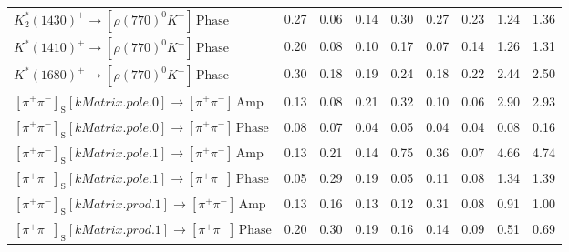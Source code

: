 \begin{tabular}{l  c  c  c  c  c  c  c  | c }
$K_{2}^{*}(1430)^{+}\rightarrow \left[\rho(770)^{0}K^{+}\right]\,\text{Phase}$ & 0.27 & 0.06 & 0.14 & 0.30 & 0.27 & 0.23 & 1.24 & 1.36 \\ 
$K^{*}(1410)^{+}\rightarrow \left[\rho(770)^{0}K^{+}\right]\,\text{Phase}$ & 0.20 & 0.08 & 0.10 & 0.17 & 0.07 & 0.14 & 1.26 & 1.31 \\ 
$K^{*}(1680)^{+}\rightarrow \left[\rho(770)^{0}K^{+}\right]\,\text{Phase}$ & 0.30 & 0.18 & 0.19 & 0.24 & 0.18 & 0.22 & 2.44 & 2.50 \\ 
$\left[\pi^{+}\pi^{-}\right]_{\text{S}}\left[kMatrix.pole.0\right]\rightarrow \left[\pi^{+}\pi^{-}\right]\,\text{Amp}$ & 0.13 & 0.08 & 0.21 & 0.32 & 0.10 & 0.06 & 2.90 & 2.93 \\ 
$\left[\pi^{+}\pi^{-}\right]_{\text{S}}\left[kMatrix.pole.0\right]\rightarrow \left[\pi^{+}\pi^{-}\right]\,\text{Phase}$ & 0.08 & 0.07 & 0.04 & 0.05 & 0.04 & 0.04 & 0.08 & 0.16 \\ 
$\left[\pi^{+}\pi^{-}\right]_{\text{S}}\left[kMatrix.pole.1\right]\rightarrow \left[\pi^{+}\pi^{-}\right]\,\text{Amp}$ & 0.13 & 0.21 & 0.14 & 0.75 & 0.36 & 0.07 & 4.66 & 4.74 \\ 
$\left[\pi^{+}\pi^{-}\right]_{\text{S}}\left[kMatrix.pole.1\right]\rightarrow \left[\pi^{+}\pi^{-}\right]\,\text{Phase}$ & 0.05 & 0.29 & 0.19 & 0.05 & 0.11 & 0.08 & 1.34 & 1.39 \\ 
$\left[\pi^{+}\pi^{-}\right]_{\text{S}}\left[kMatrix.prod.1\right]\rightarrow \left[\pi^{+}\pi^{-}\right]\,\text{Amp}$ & 0.13 & 0.16 & 0.13 & 0.12 & 0.31 & 0.08 & 0.91 & 1.00 \\ 
$\left[\pi^{+}\pi^{-}\right]_{\text{S}}\left[kMatrix.prod.1\right]\rightarrow \left[\pi^{+}\pi^{-}\right]\,\text{Phase}$ & 0.20 & 0.30 & 0.19 & 0.16 & 0.14 & 0.09 & 0.51 & 0.69 \\ 
\hline
\hline
\end{tabular}
